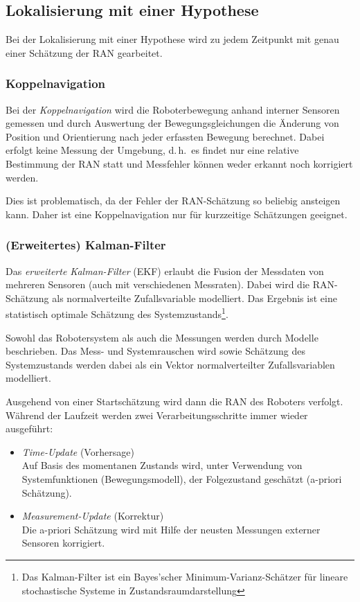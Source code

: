 \documentclass[a4paper, 11pt, accentcolor = tud3b]{tudreport}
\renewcommand{\dh}{d.\,h.~}
\begin{document}
			\subsection{Lokalisierung mit einer Hypothese}
				Bei der Lokalisierung mit einer Hypothese wird zu jedem Zeitpunkt mit genau einer Schätzung der RAN gearbeitet.

				\subsubsection{Koppelnavigation}
					Bei der \emph{Koppelnavigation} wird die Roboterbewegung anhand interner Sensoren gemessen und durch Auswertung der Bewegungsgleichungen die Änderung von Position und Orientierung nach jeder erfassten Bewegung berechnet. Dabei erfolgt keine Messung der Umgebung, \dh es findet nur eine relative Bestimmung der RAN statt und Messfehler können weder erkannt noch korrigiert werden.
					
					Dies ist problematisch, da der Fehler der RAN-Schätzung so beliebig ansteigen kann. Daher ist eine Koppelnavigation nur für kurzzeitige Schätzungen geeignet.

				\subsubsection{(Erweitertes) Kalman-Filter}
					Das \emph{erweiterte Kalman-Filter} (EKF) erlaubt die Fusion der Messdaten von mehreren Sensoren (auch mit verschiedenen Messraten). Dabei wird die RAN-Schätzung als normalverteilte Zufallsvariable modelliert. Das Ergebnis ist eine statistisch optimale Schätzung des Systemzustands\footnote{Das Kalman-Filter ist ein Bayes'scher Minimum-Varianz-Schätzer für lineare stochastische Systeme in Zustandsraumdarstellung}.
					
					Sowohl das Robotersystem als auch die Messungen werden durch Modelle beschrieben. Das Mess- und Systemrauschen wird sowie Schätzung des Systemzustands werden dabei als ein Vektor normalverteilter Zufallsvariablen modelliert.
					
					Ausgehend von einer Startschätzung wird dann die RAN des Roboters verfolgt. Während der Laufzeit werden zwei Verarbeitungsschritte immer wieder ausgeführt:
					\begin{itemize}
						\item \emph{Time-Update} (Vorhersage) \\ Auf Basis des momentanen Zustands wird, unter Verwendung von Systemfunktionen (Bewegungsmodell), der Folgezustand geschätzt (a-priori Schätzung).
						\item \emph{Measurement-Update} (Korrektur) \\ Die a-priori Schätzung wird mit Hilfe der neusten Messungen externer Sensoren korrigiert.
					\end{itemize}
				
\end{document}
